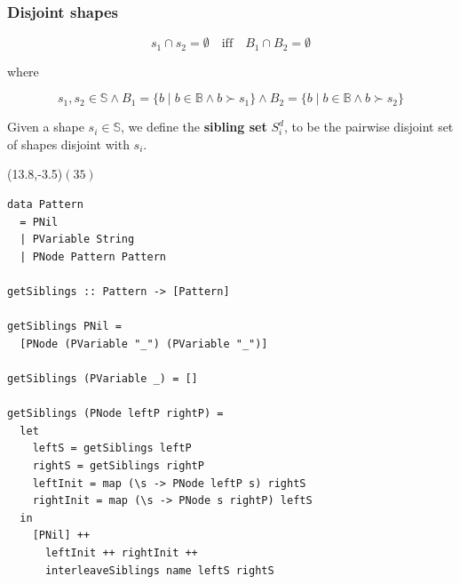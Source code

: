 \begin{frame}
\begin{columns}
\end{columns}

\end{frame}

\begin{frame}

\frametitle{Disjoint shapes}

\begin{center}

$$s_1\cap s_2=\emptyset\quad\text{iff}\quad B_1\cap B_2=\emptyset$$

where

$$s_1,s_2\in\mathbb{S} \wedge B_1=\{b\mid b\in\mathbb{B} \wedge b\succ
s_1\}\wedge B_2=\{b\mid b\in\mathbb{B} \wedge b\succ s_2\}$$

\end{center}

\end{frame}


\begin{frame}

\begin{center}

Given a shape $s_i\in\mathbb{S}$, we define the {\bf sibling set} $S^d_i$, to
be the pairwise disjoint set of shapes disjoint with $s_i$.

\end{center}

\end{frame}

\begin{frame}[fragile]

\begin{textblock}{1}(13.8,-3.5)$(35)$\end{textblock}

\begin{lstlisting}
data Pattern
  = PNil
  | PVariable String
  | PNode Pattern Pattern

getSiblings :: Pattern -> [Pattern]

getSiblings PNil =
  [PNode (PVariable "_") (PVariable "_")]

getSiblings (PVariable _) = []

getSiblings (PNode leftP rightP) =
  let
    leftS = getSiblings leftP
    rightS = getSiblings rightP
    leftInit = map (\s -> PNode leftP s) rightS
    rightInit = map (\s -> PNode s rightP) leftS
  in
    [PNil] ++
      leftInit ++ rightInit ++
      interleaveSiblings name leftS rightS
\end{lstlisting}

\end{frame}

